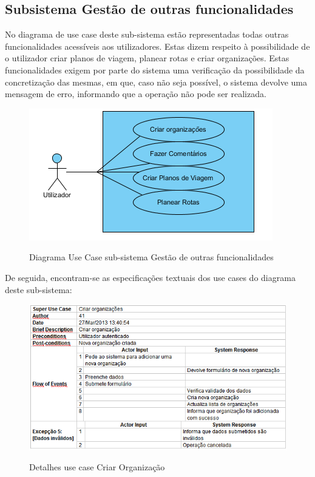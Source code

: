 ﻿\documentclass[12pt,a4paper]{article}
\begin{document}
\clearpage
\newpage

\subsection{Subsistema Gestão de outras funcionalidades}
No diagrama de use case deste sub-sistema estão representadas todas outras funcionalidades acessíveis aos utilizadores. Estas dizem respeito à possibilidade de o utilizador criar planos de viagem, planear rotas e criar organizações. Estas funcionalidades exigem por parte do sistema uma verificação da possibilidade da concretização das mesmas, em que, caso não seja possível, o sistema devolve uma mensagem de erro, informando que a operação não pode ser realizada.\\

\begin{figure}[h!]
\centering
\includegraphics[scale=1]{usecase/U_FazerCenas}
\label{usecase}
\caption{Diagrama Use Case sub-sistema Gestão de outras funcionalidades}
\end{figure}

De seguida, encontram-se as especificações textuais dos use cases do diagrama deste sub-sistema:\\

\begin{figure}[h!]
\centering
\includegraphics[scale=0.7]{d_usecase/criarorganizacao}
\label{usecase}
\caption{Detalhes use case Criar Organização}
\end{figure}
\end{document}
